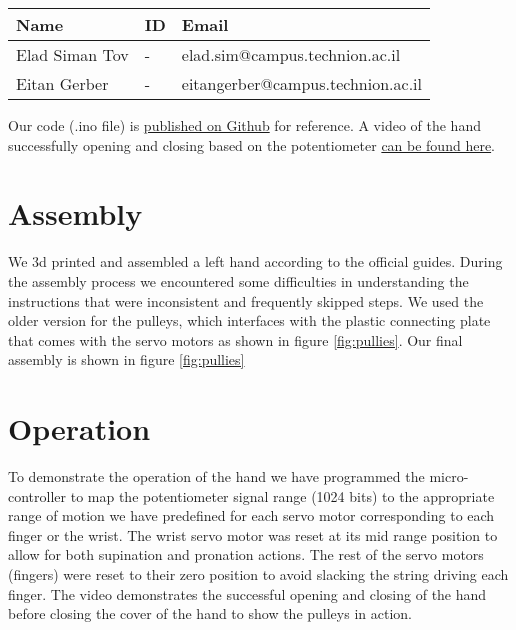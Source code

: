 \documentclass[10pt]{article}
\begin{document}
\begin{table}[h]
    \centering
    \begin{tabular}{l l l}
        \hline
        Name & ID & Email \\
        \hline
        Elad Siman Tov & - & elad.sim@campus.technion.ac.il \\
        \hline
        Eitan Gerber & - & eitangerber@campus.technion.ac.il \\
        \hline
    \end{tabular}
    \label{tab:personal_info}
\end{table}
\noindent Our code (.ino file) is \href{https://github.com/eladsimantov/Wearable-Robotics/blob/main/Final%20Project/Potentiometer_Servos.ino}{published on Github} for reference.
A video of the hand successfully opening and closing based on the potentiometer \href{https://technionmail-my.sharepoint.com/:v:/g/personal/eitangerber_campus_technion_ac_il/Ead1dbEn8xNEuNcpJJbua7sBZmVPV9wEbOwiU09-S7oXpg?e=Y54jJX}{can be found here}.

\section*{Assembly}
We 3d printed and assembled a left hand according to the official guides.
During the assembly process we encountered some difficulties in understanding the instructions that were inconsistent and frequently skipped steps. We used the older version for the pulleys, which interfaces with the plastic connecting plate that comes with the servo motors as shown in figure \ref{fig:pullies}. Our final assembly is shown in figure \ref{fig:pullies}

\section*{Operation}
To demonstrate the operation of the hand we have programmed the micro-controller to map the potentiometer signal range (1024 bits) to the appropriate range of motion we have predefined for each servo motor corresponding to each finger or the wrist. 
The wrist servo motor was reset at its mid range position to allow for both supination and pronation actions. The rest of the servo motors (fingers) were reset to their zero position to avoid slacking the string driving each finger.
The video demonstrates the successful opening and closing of the hand before closing the cover of the hand to show the pulleys in action.
\end{document}

